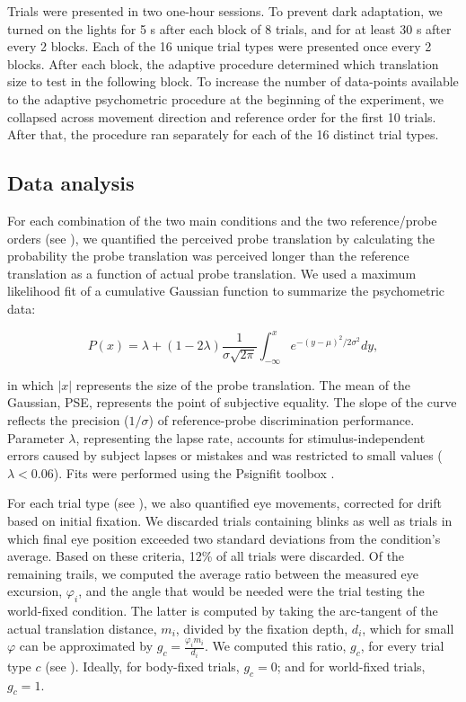 Trials were presented in two one-hour sessions. To prevent dark adaptation, we turned on the lights for 5 \si{\second} after each block of 8 trials, and for at least 30 s after every 2 blocks. Each of the 16 unique trial types were presented once every 2 blocks. After each block, the adaptive procedure determined which translation size to test in the following block. To increase the number of data-points available to the adaptive psychometric procedure at the beginning of the experiment, we collapsed across movement direction and reference order for the first 10 trials. After that, the procedure ran separately for each of the 16 distinct trial types.

\subsection{Data analysis}

For each combination of the two main conditions and the two reference/probe orders (see ), we quantified the perceived probe translation by calculating the probability the probe translation was perceived longer than the reference translation as a function of actual probe translation. We used a maximum likelihood fit of a cumulative Gaussian function to summarize the psychometric data:

\begin{equation}
\label{p4:eq1}
P(x) = \lambda + (1 - 2\lambda) \frac{1}{\sigma \sqrt{2\pi}} \int_{-\infty}^{x}{e^{-(y-\mu)^2 / 2\sigma^2}}dy,
\end{equation}

in which $|x|$ represents the size of the probe translation. The mean of the Gaussian, PSE, represents the point of subjective equality. The slope of the curve reflects the precision ($1/\sigma$) of reference-probe discrimination performance. Parameter $\lambda$, representing the lapse rate, accounts for stimulus-independent errors caused by subject lapses or mistakes and was restricted to small values ($\lambda < 0.06$). Fits were performed using the Psignifit toolbox \cite{wichmann2001,wichmann2001b}.

For each trial type (see ), we also quantified eye movements, corrected for drift based on initial fixation. We discarded trials containing blinks as well as trials in which final eye position exceeded two standard deviations from the condition's average. Based on these criteria, 12\% of all trials were discarded. Of the remaining trails, we computed the average ratio between the measured eye excursion, $\varphi_i$, and the angle that would be needed were the trial testing the world-fixed condition. The latter is computed by taking the arc-tangent of the actual translation distance, $m_i$, divided by the fixation depth, $d_i$, which for small $\varphi$ can be approximated by $g_c = \frac{\varphi_i m_i}{d_i}$. We computed this ratio, $g_c$, for every trial type $c$ (see ). Ideally, for body-fixed trials, $g_c = 0$; and for world-fixed trials, $g_c = 1$.


